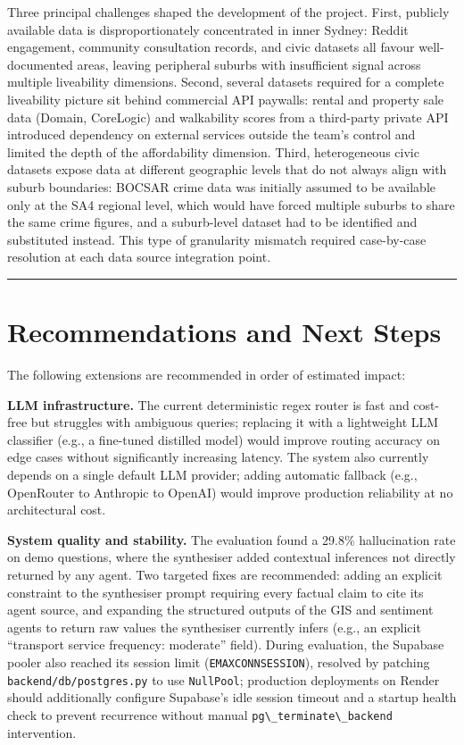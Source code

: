 \documentclass[11pt,a4paper]{article}
\newcommand{\passthrough}[1]{#1}
\begin{document}
Three principal challenges shaped the development of the project. First, publicly available data is disproportionately concentrated in inner Sydney: Reddit engagement, community consultation records, and civic datasets all favour well-documented areas, leaving peripheral suburbs with insufficient signal across multiple liveability dimensions. Second, several datasets required for a complete liveability picture sit behind commercial API paywalls: rental and property sale data (Domain, CoreLogic) and walkability scores from a third-party private API introduced dependency on external services outside the team's control and limited the depth of the affordability dimension. Third, heterogeneous civic datasets expose data at different geographic levels that do not always align with suburb boundaries: BOCSAR crime data was initially assumed to be available only at the SA4 regional level, which would have forced multiple suburbs to share the same crime figures, and a suburb-level dataset had to be identified and substituted instead. This type of granularity mismatch required case-by-case resolution at each data source integration point.

\begin{center}\rule{0.5\linewidth}{0.5pt}\end{center}

\section{Recommendations and Next Steps}\label{8-recommendations-and-next-steps}

The following extensions are recommended in order of estimated impact:

\textbf{LLM infrastructure.} The current deterministic regex router is fast and cost-free but struggles with ambiguous queries; replacing it with a lightweight LLM classifier (e.g., a fine-tuned distilled model) would improve routing accuracy on edge cases without significantly increasing latency. The system also currently depends on a single default LLM provider; adding automatic fallback (e.g., OpenRouter to Anthropic to OpenAI) would improve production reliability at no architectural cost.

\textbf{System quality and stability.} The evaluation found a 29.8\% hallucination rate on demo questions, where the synthesiser added contextual inferences not directly returned by any agent. Two targeted fixes are recommended: adding an explicit constraint to the synthesiser prompt requiring every factual claim to cite its agent source, and expanding the structured outputs of the GIS and sentiment agents to return raw values the synthesiser currently infers (e.g., an explicit ``transport service frequency: moderate'' field). During evaluation, the Supabase pooler also reached its session limit (\passthrough{\lstinline!EMAXCONNSESSION!}), resolved by patching \passthrough{\lstinline!backend/db/postgres.py!} to use \passthrough{\lstinline!NullPool!}; production deployments on Render should additionally configure Supabase's idle session timeout and a startup health check to prevent recurrence without manual \passthrough{\lstinline!pg\_terminate\_backend!} intervention.
\end{document}
